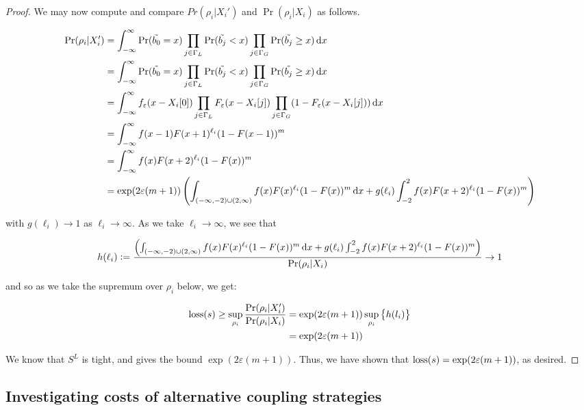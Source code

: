 \documentclass{article}
\renewcommand{\epsilon}{\varepsilon}
\newcommand{\loss}{\textup{loss}}
\newcommand{\1}{\langle 1 \rangle}
\newcommand{\2}{\langle 2 \rangle}
\begin{document}
\begin{proof}
    We may now compute and compare $Pr(\rho_i | X_i')$ and $\Pr(\rho_i | X_i)$ as follows.

    \begin{align*}
        \Pr(\rho_i | X_i') &= \int_{-\infty}^\infty \Pr(\tilde{b_0} = x) \prod_{j \in \Gamma_L} \Pr(\tilde{b_j} < x) \prod_{j \in \Gamma_G} \Pr(\tilde{b_j} \geq x) \dif x\\
        &= \int_{-\infty}^\infty \Pr(\tilde{b_0} = x) \prod_{j \in \Gamma_L} \Pr(\tilde{b_j} < x) \prod_{j \in \Gamma_G} \Pr(\tilde{b_j} \geq x) \dif x\\
        &= \int_{-\infty}^\infty f_\epsilon(x - X_i[0]) \prod_{j \in \Gamma_L} F_\epsilon(x - X_i[j]) \prod_{j \in \Gamma_G} (1 - F_\epsilon(x - X_i[j])) \dif x\\
        &= \int_{-\infty}^\infty f(x - 1) F(x + 1)^{\ell_i}  (1 - F(x - 1))^m \\
        &= \int_{-\infty}^\infty f(x) F(x + 2)^{\ell_i}  (1 - F(x))^m \\
        &= \exp(2\epsilon (m + 1) )\left(\int_{(-\infty, -2) \cup (2, \infty)} f(x) F(x)^{\ell_i}  (1 - F(x))^m \dif x + g(\ell_i) \int_{-2}^2 f(x) F(x + 2)^{\ell_i}  (1 - F(x))^m\right)
    \end{align*}

    with $g(\ell_i) \to 1$ as $\ell_i \to \infty$. As we take $\ell_i \to \infty$, we see that 

    \begin{align*}
        h(\ell_i) := \frac{\left(\int_{(-\infty, -2) \cup (2, \infty)} f(x) F(x)^{\ell_i}  (1 - F(x))^m \dif x + g(\ell_i) \int_{-2}^2 f(x) F(x + 2)^{\ell_i}  (1 - F(x))^m\right)}{\Pr(\rho_i | X_i)} \to 1
    \end{align*}

    and so as we take the supremum over $\rho_i$ below, we get: 

    \begin{align*}
        \loss(s) \geq \sup_{\rho_i} \frac{\Pr(\rho_i | X_i')}{\Pr(\rho_i | X_i)} &= \exp(2\epsilon(m + 1)) \sup_{\rho_i} \left\{ h(l_i) \right\}\\
        &= \exp(2\epsilon(m + 1))
    \end{align*}

    We know that $S^L$ is tight, and gives the bound $\exp(2\epsilon(m + 1))$. Thus, we have shown that $\loss(s) = \exp(2\epsilon(m + 1))$, as desired.
\end{proof}

\subsection{Investigating costs of alternative coupling strategies}
\end{document}
